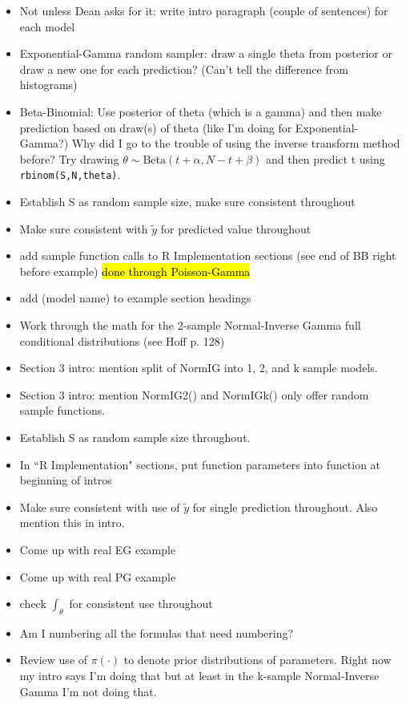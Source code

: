 \documentclass[12pt, a4paper]{article}
\begin{document}
\begin{itemize}
  \item Not unless Dean asks for it:  write intro paragraph (couple of sentences) for each model
  \item Exponential-Gamma random sampler:  draw a single theta from posterior or draw a new one for each prediction?  (Can't tell the difference from histograms)
  \item Beta-Binomial:  Use posterior of theta (which is a gamma) and then make prediction based on draw(s) of theta (like I'm doing for Exponential-Gamma?)  Why did I go to the trouble of using the inverse transform method before?  Try drawing $\theta\sim\text{Beta}(t+\alpha,N-t+\beta)$ and then predict t using \texttt{rbinom(S,N,theta)}.
  \item Establish S as random sample size, make sure consistent throughout
  \item Make sure consistent with $\tilde{y}$ for predicted value throughout
  \item add sample function calls to R Implementation sections (see end of BB right before example) \hl{done through Poisson-Gamma}
  \item add (model name) to example section headings
  \item Work through the math for the 2-sample Normal-Inverse Gamma full conditional distributions (see Hoff p. 128)
  \item Section 3 intro:  mention split of NormIG into 1, 2, and k sample models.
  \item Section 3 intro:  mention NormIG2() and NormIGk() only offer random sample functions.
  \item Establish S as random sample size throughout.
  \item In ``R Implementation" sections, put function parameters into function at beginning of intros
  \item Make sure consistent with use of $\tilde{y}$ for single prediction throughout.  Also mention this in intro.
  \item Come up with real EG example
  \item Come up with real PG example
  \item check $\int_\theta$ for consistent use throughout
  \item Am I numbering all the formulas that need numbering?
  \item Review use of $\pi(\cdot)$ to denote prior distributions of parameters.  Right now my intro says I'm doing that but at least in the k-sample Normal-Inverse Gamma I'm not doing that.

\end{itemize}
\end{document}
